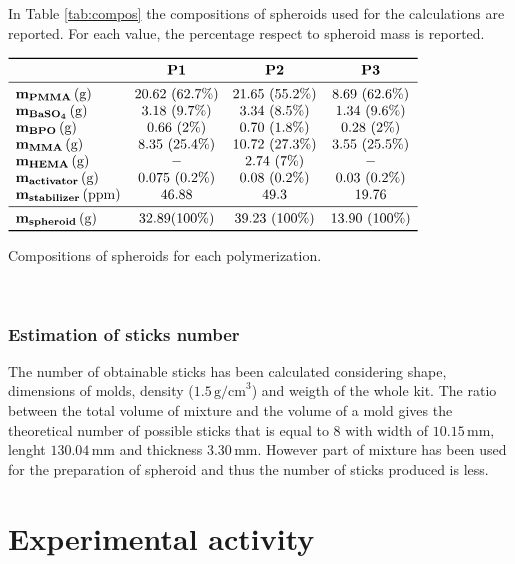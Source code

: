 \documentclass[a4paper, 11pt]{article}
\begin{document}
\newpage

In Table \ref{tab:compos} the compositions of spheroids used for the calculations are reported. For each value, the percentage respect to spheroid mass is reported.
\begin{table}[htp]
\centering
$
\begin{array}{lccc}
\toprule
& \textbf{P1} & \textbf{P2} & \textbf{P3}  \\
\midrule
\mathbf{m_{PMMA}}\,(\text{g}) & 20.62\ (62.7\%) & 21.65\ (55.2\%) & 8.69\ (62.6\%) \\
\mathbf{m_{BaSO_4}}\,(\text{g}) & 3.18\ (9.7\%) & 3.34\ (8.5\%) & 1.34\ (9.6\%) \\
\mathbf{m_{BPO}}\,(\text{g}) & 0.66\ (2\%) & 0.70\ (1.8\%) & 0.28\ (2\%) \\
\mathbf{m_{MMA}}\,(\text{g}) & 8.35\ (25.4\%) & 10.72\ (27.3\%) & 3.55\ (25.5\%) \\
\mathbf{m_{HEMA}}\,(\text{g}) & - & 2.74\ (7\%) & - \\
\mathbf{m_{activator}}\,(\text{g}) & 0.075\ (0.2\%) & 0.08\ (0.2\%) & 0.03\ (0.2\%) \\
\mathbf{m_{stabilizer}}\,(\text{ppm}) & 46.88 & 49.3 & 19.76 \\
\midrule
\mathbf{m_{spheroid}}\,(\text{g}) & 32.89 (100\%) & 39.23
\ (100\%) & 13.90\ (100\%) \\
\bottomrule
\end{array}
$
\caption{Compositions of spheroids for each polymerization.}
\label{tab:compos}
\end{table}\\


\subsubsection{Estimation of sticks number}

The number of obtainable sticks has been calculated considering shape, dimensions 
of molds, density ($1.5\,\text{g/cm}^3$) and weigth of the whole kit.
The ratio between the total volume of mixture and the volume of a mold gives the theoretical number of possible sticks that is equal to 8 with width of $10.15\,\text{mm}$, lenght $130.04\,\text{mm}$ and thickness $3.30\,\text{mm}$.
However part of mixture has been used for the preparation of spheroid and thus the number of sticks produced is less.

\newpage

\section{Experimental activity}
\end{document}

